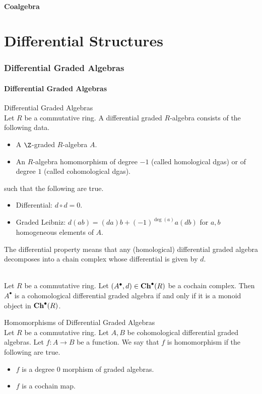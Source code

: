 \documentclass[a4paper]{article}
\begin{document}
\subsection{Coalgebra}

\pagebreak

\part{Differential Structures}

\pagebreak
\section{Differential Graded Algebras}
\subsection{Differential Graded Algebras}
\begin{defn}{Differential Graded Algebras}{}\\
Let $R$ be a commutative ring. A differential graded $R$-algebra consists of the following data. 
\begin{itemize}
\item A $\Z$-graded $R$-algebra $A$. 
\item An $R$-algebra homomorphism of degree $-1$ (called homological dgas) or of degree $1$ (called cohomological dgas). 
\end{itemize}
such that the following are true. 
\begin{itemize}
\item Differential: $d\circ d=0$. 
\item Graded Leibniz: $d(ab)=(da)b+(-1)^{\deg(a)}a(db)$ for $a,b$ homogeneous elements of $A$. 
\end{itemize}
\end{defn}

The differential property means that any (homological) differential graded algebra decomposes into a chain complex whose differential is given by $d$. 

\begin{lmm}{}{}\\
Let $R$ be a commutative ring. Let $(A^\bullet,d)\in\bold{Ch}^\bullet(R)$ be a cochain complex. Then $A^\bullet$ is a cohomological differential graded algebra if and only if it is a monoid object in $\bold{Ch}^\bullet(R)$. 
\end{lmm}

\begin{defn}{Homomorphisms of Differential Graded Algebras}{}\\
Let $R$ be a commutative ring. Let $A,B$ be cohomological differential graded algebras. Let $f:A\to B$ be a function. We say that $f$ is homomorphism if the following are true. 
\begin{itemize}
\item $f$ is a degree $0$ morphism of graded algebras. 
\item $f$ is a cochain map. 
\end{itemize}
\end{defn}
\end{document}

